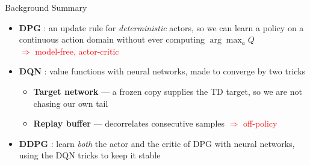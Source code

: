 \begin{frame}{Background Summary}
\vspace{0.5em}
\begin{itemize}
    \setlength{\itemsep}{0.7em}
    \item \textbf{DPG} : an update rule for \emph{deterministic} actors, so we can learn a policy on a continuous action domain without ever computing $\arg\max_a Q$
    \\[0.2em] \textcolor{red}{$\Rightarrow$ model-free, actor-critic}
    \pause
    \item \textbf{DQN} : value functions with neural networks, made to converge by two tricks
    \begin{itemize}
        \item \textbf{Target network} --- a frozen copy supplies the TD target, so we are not chasing our own tail
        \item \textbf{Replay buffer} --- decorrelates consecutive samples \; \textcolor{red}{$\Rightarrow$ off-policy}
    \end{itemize}
    \pause
    \item \textbf{DDPG} : learn \emph{both} the actor and the critic of DPG with neural networks, using the DQN tricks to keep it stable
\end{itemize}
\end{frame}
